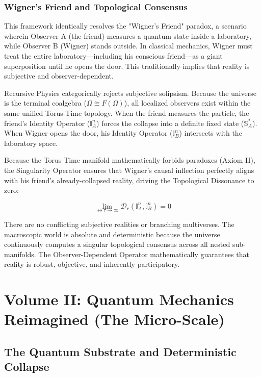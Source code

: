 \documentclass[12pt,openany]{book}
\begin{document}
\section{Wigner's Friend and Topological Consensus}
This framework identically resolves the "Wigner's Friend" paradox, a scenario wherein Observer A (the friend) measures a quantum state inside a laboratory, while Observer B (Wigner) stands outside. In classical mechanics, Wigner must treat the entire laboratory---including his conscious friend---as a giant superposition until he opens the door. This traditionally implies that reality is subjective and observer-dependent.

Recursive Physics categorically rejects subjective solipsism. Because the universe is the terminal coalgebra ($\Omega \cong F(\Omega)$), all localized observers exist within the same unified Torus-Time topology. When the friend measures the particle, the friend's Identity Operator ($\mathbb{I}_A^n$) forces the collapse into a definite fixed state ($\mathbb{S}_A^*$). When Wigner opens the door, his Identity Operator ($\mathbb{I}_B^n$) intersects with the laboratory space.

Because the Torus-Time manifold mathematically forbids paradoxes (Axiom II), the Singularity Operator ensures that Wigner's causal inflection perfectly aligns with his friend's already-collapsed reality, driving the Topological Dissonance to zero:

\begin{equation}
\lim_{\leftrightarrow\tau \to \infty} \mathcal{D}_r(\mathbb{I}_A^n, \mathbb{I}_B^n) = 0
\end{equation}

There are no conflicting subjective realities or branching multiverses. The macroscopic world is absolute and deterministic because the universe continuously computes a singular topological consensus across all nested sub-manifolds. The Observer-Dependent Operator mathematically guarantees that reality is robust, objective, and inherently participatory.

\part{Volume II: Quantum Mechanics Reimagined (The Micro-Scale)}

\chapter{The Quantum Substrate and Deterministic Collapse}
\end{document}

